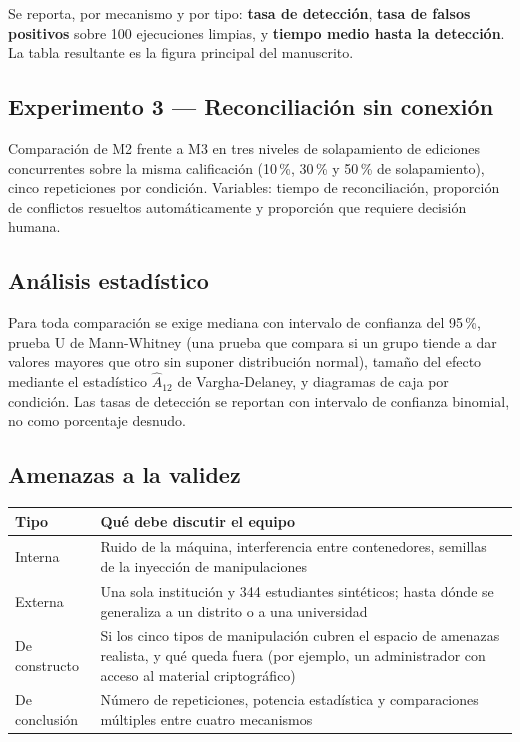 \documentclass[11pt,a4paper]{article}
\begin{document}
Se reporta, por mecanismo y por tipo: \textbf{tasa de detección}, \textbf{tasa de falsos positivos} sobre 100 ejecuciones limpias, y \textbf{tiempo medio hasta la detección}. La tabla resultante es la figura principal del manuscrito.

\subsection{Experimento 3 --- Reconciliación sin conexión}

Comparación de M2 frente a M3 en tres niveles de solapamiento de ediciones concurrentes sobre la misma calificación (10\,\%, 30\,\% y 50\,\% de solapamiento), cinco repeticiones por condición. Variables: tiempo de reconciliación, proporción de conflictos resueltos automáticamente y proporción que requiere decisión humana.

\subsection{Análisis estadístico}

Para toda comparación se exige mediana con intervalo de confianza del 95\,\%, prueba U de Mann-Whitney (una prueba que compara si un grupo tiende a dar valores mayores que otro sin suponer distribución normal), tamaño del efecto mediante el estadístico $\hat{A}_{12}$ de Vargha-Delaney, y diagramas de caja por condición. Las tasas de detección se reportan con intervalo de confianza binomial, no como porcentaje desnudo.

\subsection{Amenazas a la validez}

\begin{center}
	\small
	\begin{tabular}{@{}p{3.2cm}p{11.8cm}@{}}
		\toprule
		\textbf{Tipo} & \textbf{Qué debe discutir el equipo} \\
		\midrule
		Interna & Ruido de la máquina, interferencia entre contenedores, semillas de la inyección de manipulaciones \\
		\addlinespace
		Externa & Una sola institución y 344 estudiantes sintéticos; hasta dónde se generaliza a un distrito o a una universidad \\
		\addlinespace
		De constructo & Si los cinco tipos de manipulación cubren el espacio de amenazas realista, y qué queda fuera (por ejemplo, un administrador con acceso al material criptográfico) \\
		\addlinespace
		De conclusión & Número de repeticiones, potencia estadística y comparaciones múltiples entre cuatro mecanismos \\
		\bottomrule
	\end{tabular}
\end{center}
\end{document}
